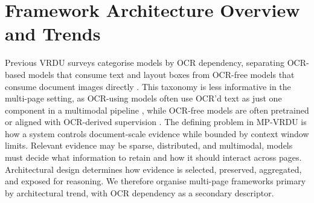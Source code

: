 \documentclass[11pt]{article}
\begin{document}



\section{Framework Architecture Overview and Trends}
Previous VRDU surveys categorise models by OCR dependency, separating OCR-based models that consume text and layout boxes from OCR-free models that consume document images directly \cite{huang2022layoutlmv3, ding2025survey}. This taxonomy is less informative in the multi-page setting, as OCR-using models often use OCR'd text as just one component in a multimodal pipeline \cite{sun2025docagent, wang2025vidorag}, while OCR-free models are often pretrained or aligned with OCR-derived supervision \cite{tanaka2025vdocrag, hu2024mplug}. The defining problem in MP-VRDU is how a system controls document-scale evidence while bounded by context window limits. Relevant evidence may be sparse, distributed, and multimodal, models must decide what information to retain and how it should interact across pages. Architectural design determines how evidence is selected, preserved, aggregated, and exposed for reasoning. We therefore organise multi-page frameworks primary by architectural trend, with OCR dependency as a secondary descriptor.
\end{document}
